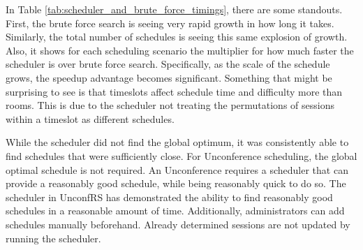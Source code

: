In Table \ref{tab:scheduler_and_brute_force_timings}, there are some standouts. First, the brute force search is seeing very rapid growth in how long it takes. Similarly, the total number of schedules is seeing this same explosion of growth. Also, it shows for each scheduling scenario the multiplier for how much faster the scheduler is over brute force search. Specifically, as the scale of the schedule grows, the speedup advantage becomes significant. Something that might be surprising to see is that timeslots affect schedule time and difficulty more than rooms. This is due to the scheduler not treating the permutations of sessions within a timeslot as different schedules.


While the scheduler did not find the global optimum, it was consistently able to find schedules that were sufficiently close. For Unconference scheduling, the global optimal schedule is not required. An Unconference requires a scheduler that can provide a reasonably good schedule, while being reasonably quick to do so. The scheduler in UnconfRS has demonstrated the ability to find reasonably good schedules in a reasonable amount of time. Additionally, administrators can add schedules manually beforehand. Already determined sessions are not updated by running the scheduler.